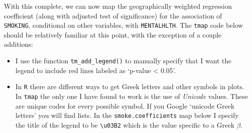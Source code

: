 \documentclass[
]{book}
\providecommand{\tightlist}{%
  \setlength{\itemsep}{0pt}\setlength{\parskip}{0pt}}
\begin{document}
With this complete, we can now map the geographically weighted regression coefficient (along with adjusted test of significance) for the association of \texttt{SMOKING}, conditional on other variables, with \texttt{MENTALHLTH}. The \texttt{tmap} code below should be relatively familiar at this point, with the exception of a couple additions:

\begin{itemize}
\tightlist
\item
  I use the function \texttt{tm\_add\_legend()} to manually specify that I want the legend to include red lines labeled as `p-value \textless{} 0.05'.
\item
  In \texttt{R} there are different ways to get Greek letters and other symbols in plots. In \texttt{tmap} the only one I have found to work is the use of \emph{Unicode} values. These are unique codes for every possible symbol. If you Google `unicode Greek letters' you will find lists. In the \texttt{smoke.coefficients} map below I specify the title of the legend to be \texttt{\textbackslash{}u03B2} which is the value specific to a Greek \(\beta\).
\end{itemize}
\end{document}
